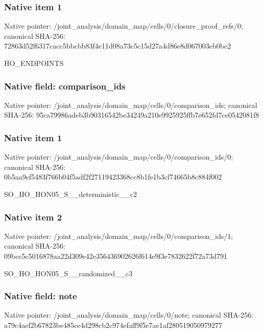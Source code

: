 \documentclass[10pt,a4paper]{article}
\begin{document}
\subsubsection{Native item 1}
Native pointer: /joint\_\allowbreak{}analysis/domain\_\allowbreak{}map/cells/0/closure\_\allowbreak{}proof\_\allowbreak{}refs/0; canonical SHA-256: 72863d52f6317cacc5bbcbb83f4e11d08a73c5c15d27a4d86e8d067003eb0be2

\begingroup\raggedright\sloppy HO\_\allowbreak{}ENDPOINTS\par\endgroup

\subsubsection{Native field: comparison\_\allowbreak{}ids}
Native pointer: /joint\_\allowbreak{}analysis/domain\_\allowbreak{}map/cells/0/comparison\_\allowbreak{}ids; canonical SHA-256: 95ca79986adeb3b90316542be34249a210e9925925ffb7e652fd7ce0542081f8

\subsubsection{Native item 1}
Native pointer: /joint\_\allowbreak{}analysis/domain\_\allowbreak{}map/cells/0/comparison\_\allowbreak{}ids/0; canonical SHA-256: 0b5aa9ef5483f766b04f5adf2f27119423368cc8b1fe1b3cf74665b8c884f002

\begingroup\raggedright\sloppy SO\_\allowbreak{}HO\_\allowbreak{}HON05\_\allowbreak{}S\_\allowbreak{}\_\allowbreak{}deterministic\_\allowbreak{}\_\allowbreak{}c2\par\endgroup

\subsubsection{Native item 2}
Native pointer: /joint\_\allowbreak{}analysis/domain\_\allowbreak{}map/cells/0/comparison\_\allowbreak{}ids/1; canonical SHA-256: 09bcc5c5016878aa22d309e42e356436902626f614e9f3e7832622f72a73d791

\begingroup\raggedright\sloppy SO\_\allowbreak{}HO\_\allowbreak{}HON05\_\allowbreak{}S\_\allowbreak{}\_\allowbreak{}randomized\_\allowbreak{}\_\allowbreak{}c3\par\endgroup

\subsubsection{Native field: note}
Native pointer: /joint\_\allowbreak{}analysis/domain\_\allowbreak{}map/cells/0/note; canonical SHA-256: a79c4aef2b67823be485ce4d298cb2c974efaff9f5e7ae1af280519050979277
\end{document}
